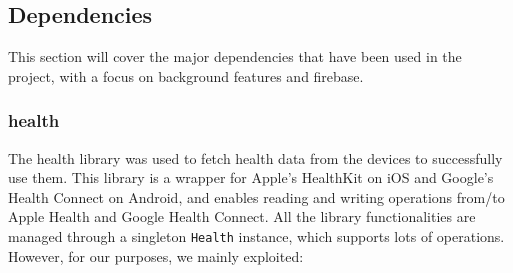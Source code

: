 \subsection{Dependencies}
This section will cover the major dependencies that have been used in the project, with a focus on background features and firebase.



\subsubsection{health}
The health library was used to fetch health data from the devices to successfully use them. This library is a wrapper for Apple's HealthKit on iOS and Google's Health Connect on Android, and enables reading and writing operations from/to Apple Health and Google Health Connect. All the library functionalities are managed through a singleton \texttt{Health} instance, which supports lots of operations. \newline However, for our purposes, we mainly exploited: 

